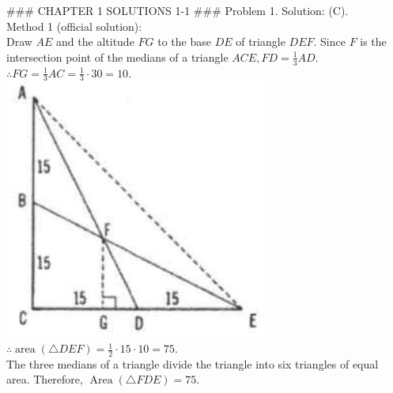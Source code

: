 \documentclass[10pt]{article}
\begin{document}
### CHAPTER 1 SOLUTIONS 1-1 ###
Problem 1. Solution: (C).\\
Method 1 (official solution):\\
Draw \(A E\) and the altitude \(F G\) to the base \(D E\) of triangle \(D E F\). Since \(F\) is the intersection point of the medians of a triangle \(A C E, F D=\frac{1}{3} A D\).\\
\(\therefore F G=\frac{1}{3} A C=\frac{1}{3} \cdot 30=10\).\\
\includegraphics[max width=\textwidth, center]{2025_04_17_97bc1f7e44d93c271a88g-017(1)}\\
\(\therefore \operatorname{area}(\triangle D E F)=\frac{1}{2} \cdot 15 \cdot 10=75\).\\
The three medians of a triangle divide the triangle into six triangles of equal area. Therefore, \(\operatorname{Area}(\triangle F D E)=75\).
\end{document}
